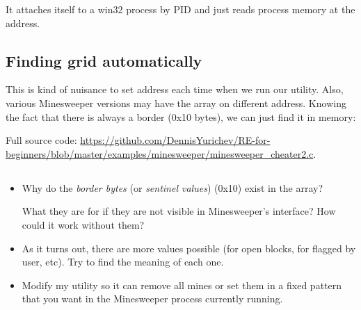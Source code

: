 It attaches itself to a win32 process by \ac{PID} and just reads process memory at the address.

\subsection{Finding grid automatically}

This is kind of nuisance to set address each time when we run our utility.
Also, various Minesweeper versions may have the array on different address.
Knowing the fact that there is always a border (0x10 bytes), we can just find it in memory:



Full source code: \url{https://github.com/DennisYurichev/RE-for-beginners/blob/master/examples/minesweeper/minesweeper_cheater2.c}.

\subsection{\Exercises}

\begin{itemize}

\item 
Why do the \emph{border bytes} (or \emph{sentinel values}) (0x10) exist in the array?

What they are for if they are not visible in Minesweeper's interface?
How could it work without them?

\item 
As it turns out, there are more values possible (for open blocks, for flagged by user, etc).
Try to find the meaning of each one.

\item 
Modify my utility so it can remove all mines or set them in a fixed pattern that you want in the Minesweeper
process currently running.

\end{itemize}
